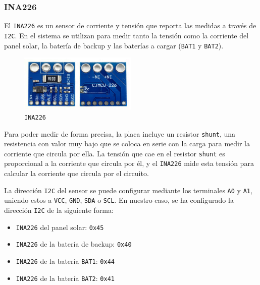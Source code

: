 \subsubsection{INA226}

El \texttt{INA226} es un sensor de corriente y tensión que reporta las medidas a través de \texttt{I2C}. En el sistema se utilizan para medir tanto la tensión como la corriente del panel solar, la batería de backup y las baterías a cargar (\texttt{BAT1} y \texttt{BAT2}). \cite{texasinstrumentsINA22636V16Bit}

\begin{figure}[H]
    \centering
    \includegraphics[width=0.5\textwidth]{images/2-hardware/componentes/INA226.jpg}
    \caption{\texttt{INA226}}
    \label{fig:hardware/modulos/ina226}
\end{figure}

Para poder medir de forma precisa, la placa incluye un resistor \texttt{shunt}, una resistencia con valor muy bajo que se coloca en serie con la carga para medir la corriente que circula por ella. La tensión que cae en el resistor \texttt{shunt} es proporcional a la corriente que circula por él, y el \texttt{INA226} mide esta tensión para calcular la corriente que circula por el circuito.

La dirección \texttt{I2C} del sensor se puede configurar mediante los terminales \texttt{A0} y \texttt{A1}, uniendo estos a \texttt{VCC}, \texttt{GND}, \texttt{SDA} o \texttt{SCL}. En nuestro caso, se ha configurado la dirección \texttt{I2C} de la siguiente forma:

\begin{itemize}
    \item \texttt{INA226} del panel solar: \texttt{0x45}
    \item \texttt{INA226} de la batería de backup: \texttt{0x40}
    \item \texttt{INA226} de la batería \texttt{BAT1}: \texttt{0x44}
    \item \texttt{INA226} de la batería \texttt{BAT2}: \texttt{0x41}
\end{itemize}

